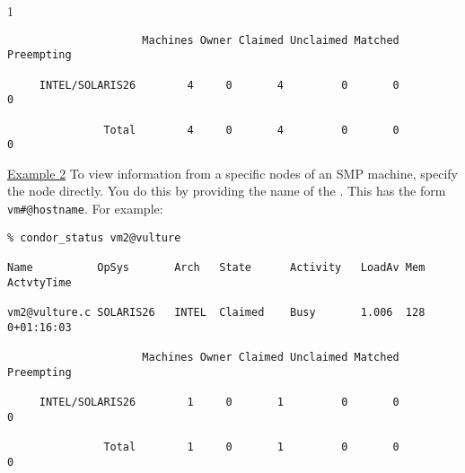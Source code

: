 \begin{ManPage}{\label{man-condor-status}}{1}
\begin{verbatim}
                     Machines Owner Claimed Unclaimed Matched Preempting

     INTEL/SOLARIS26        4     0       4         0       0          0

               Total        4     0       4         0       0          0
\end{verbatim}

\underline{Example 2} To view information from a specific nodes of an
SMP machine, specify the node directly.
You do this by providing the name of the .
This has the form \texttt{vm\#@hostname}.
For example:
\begin{verbatim}
% condor_status vm2@vulture

Name          OpSys       Arch   State      Activity   LoadAv Mem   ActvtyTime

vm2@vulture.c SOLARIS26   INTEL  Claimed    Busy       1.006  128   0+01:16:03

                     Machines Owner Claimed Unclaimed Matched Preempting

     INTEL/SOLARIS26        1     0       1         0       0          0

               Total        1     0       1         0       0          0
\end{verbatim}

\end{ManPage}

